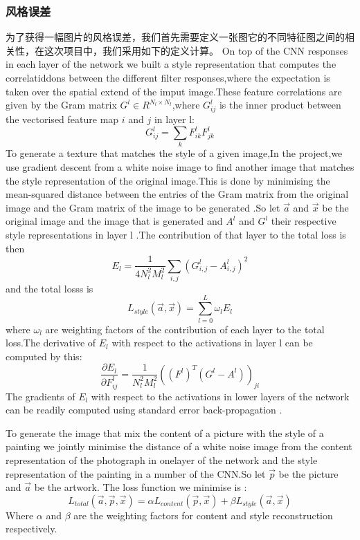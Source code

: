 \documentclass[10pt,a4paper]{ctexart}
\begin{document}
    \subsubsection{风格误差}
    为了获得一幅图片的风格误差，我们首先需要定义一张图它的不同特征图之间的相关性，在这次项目中，我们采用如下的定义计算。
    On top of the CNN responses in each layer of the network we built a style representation that computes the correlatiddons between the different filter responses,where the expectation is taken over the spatial extend of the imput image.These feature correlations are given by the Gram
	matrix $G^l \in R^{N_l\times N_l}$,where $G_{ij}^l$ is the inner product between the vectorised feature map $i$ and $j$ in layer l:
	\begin{equation}
	G_{ij}^{l} = \sum_k F_{ik}^lF_{jk}^l	
	\end{equation}
	To generate a texture that matches the style of a given image,In the project,we use gradient descent from a white noise image to find another image that matches the style representation of the original image.This is
	done by minimising the mean-squared distance between the entries of the Gram matrix from the original image and the Gram matrix of the
	image to be generated .So let $\overrightarrow{a}$ and $\overrightarrow{x}$ be the original image and the image that is generated
	and $A^l$ and $G^l$ their respective style representations in layer l .The
	contribution of that layer to the total loss is then 
	\begin{equation}
	E_l = \dfrac{1}{4N_l^2M_l^2}\sum_{i,j}(G_{i,j}^l - A_{i,j}^l)^2
	\end{equation}
	and the total losss is 
	\begin{equation}
	L_{style}(\overrightarrow{a},\overrightarrow{x})= \sum_{l=0}^{L}\omega_l
	E_l
	\end{equation}
	where $\omega_l$ are weighting factors of the contribution of each layer to the total loss.The derivative of $E_l$ with respect to the activations 
	in layer l can be computed by this:
	\begin{equation}
	\dfrac{\partial E_l}{\partial F_{ij}^l}= \dfrac{1}{N_l^2M_l^2}((F^l)^T(G^l-A^l))_{ji}
	\end{equation}
	The gradients of $E_l$ with respect to the activations in lower layers of the network can be readily computed using standard error back-propagation
	.
	
	To generate the image that mix the content of a picture with the style of a
	painting we jointly minimise the distance of a white noise image from the
	content representation of the photograph in onelayer of the network and the style representation of the painting in a number of the CNN.So let 
	$\overrightarrow{p}$ be the picture and $\overrightarrow{a}$ be the artwork. The loss function we minimise is :
	\begin{equation}
	L_{total}(\overrightarrow{a},\overrightarrow{p},\overrightarrow{x})=\alpha L_{content}(\overrightarrow{p},\overrightarrow{x})+\beta
	L_{style}(\overrightarrow{a},\overrightarrow{x})
	\end{equation}
	Where $\alpha$ and $\beta$ are the weighting factors for content and style reconstruction respectively.
	
	
\end{document}

